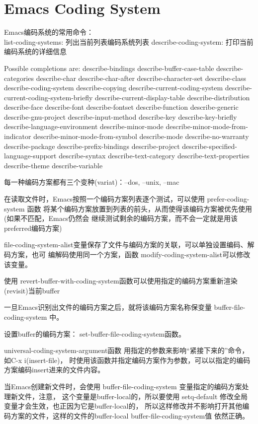 \documentclass[a4paper,11pt]{article}
\begin{document}
  \section[Emacs Coding System]{Emacs Coding System}
  Emacs编码系统的常用命令：\\
  list-coding-systems: 列出当前列表编码系统列表
  describe-coding-system: 打印当前编码系统的详细信息

  Possible completions are:
  describe-bindings 	describe-buffer-case-table
  describe-categories 	describe-char
  describe-char-after 	describe-character-set
  describe-class 	describe-coding-system
  describe-copying 	describe-current-coding-system
  describe-current-coding-system-briefly 	describe-current-display-table
  describe-distribution 	describe-face
  describe-font 	describe-fontset
  describe-function 	describe-generic
  describe-gnu-project 	describe-input-method
  describe-key 	describe-key-briefly
  describe-language-environment 	describe-minor-mode
  describe-minor-mode-from-indicator 	describe-minor-mode-from-symbol
  describe-mode 	describe-no-warranty
  describe-package 	describe-prefix-bindings
  describe-project 	describe-specified-language-support
  describe-syntax 	describe-text-category
  describe-text-properties 	describe-theme
  describe-variable

  每一种编码方案都有三个变种(variat)：--dos, --unix, --mac

  在读取文件时，Emacs按照一个编码方案列表逐个测试，可以使用 prefer-coding-system 函数
  将某个编码方案放置到列表的前头，从而使得该编码方案被优先使用(如果不匹配，Emacs仍然会
  继续测试剩余的编码方案，而不会一定就是用该preferred编码方案)

  file-coding-system-alist变量保存了文件与编码方案的关联，可以单独设置编码、解码方案，也可
  编解码使用同一个方案，函数 modify-coding-system-alist可以修改该变量。

  使用 revert-buffer-with-coding-system函数可以使用指定的编码方案重新渲染(revisit)当前buffer

  一旦Emacs识别出文件的编码方案之后，就将该编码方案名称保变量 buffer-file-coding-system 中。

  设置buffer的编码方案： set-buffer-file-coding-system函数。

  universal-coding-system-argument函数 用指定的参数来影响“紧接下来的”命令，如C-x i(insert-file)，
  时使用该函数并指定编码方案作为参数，可以以指定的编码方案编码insert进来的文件内容。

  当Emacs创建新文件时，会使用 buffer-file-coding-system 变量指定的编码方案处理新文件，注意，
  这个变量是buffer-local的，所以要使用 setq-default 修改全局变量才会生效，也正因为它是buffer-local的，
  所以这样修改并不影响打开其他编码方案的文件，这样的文件的buffer-local buffer-file-coding-system值
  依然正确。
\end{document}
